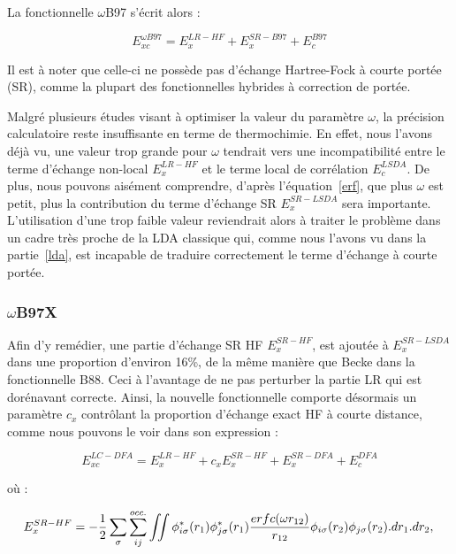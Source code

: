 	La fonctionnelle $\omega$B97\cite{chai2008long} s'écrit alors :
	
	\begin{equation}
	E_{xc}^{\omega B97} = E_{x}^{LR-HF} + E_{x}^{SR-B97} + E_{c}^{B97}
	\end{equation}
	
	Il est à noter que celle-ci ne possède pas d'échange Hartree-Fock à courte portée (SR), comme la plupart des fonctionnelles hybrides à correction de portée.
	
	Malgré plusieurs études visant à optimiser la valeur du paramètre $\omega$, la précision calculatoire reste insuffisante en terme de thermochimie. En effet, nous l'avons déjà vu, une valeur trop grande pour $\omega$ tendrait vers une incompatibilité entre le terme d'échange non-local $E_{x}^{LR-HF}$ et le terme local de corrélation $E_{c}^{LSDA}$. De plus, nous pouvons aisément comprendre, d'après l'équation~\ref{erf}, que plus $\omega$ est petit, plus la contribution du terme d'échange SR $E_{x}^{SR-LSDA}$ sera importante. L'utilisation d'une trop faible valeur  reviendrait alors à traiter le problème dans un cadre très proche de la LDA classique qui, comme nous l'avons vu dans la partie~\ref{lda}, est incapable de traduire correctement le terme d'échange à courte portée.
	
	\subsubsection{$\omega$B97X}
	
	Afin d'y remédier, une partie d'échange SR HF $E_{x}^{SR-HF}$, est ajoutée à $E_{x}^{SR-LSDA}$ dans une proportion d'environ 16\%,  de la même manière que Becke dans la fonctionnelle B88. Ceci à l'avantage de ne pas perturber la partie LR qui est dorénavant correcte. Ainsi, la nouvelle fonctionnelle comporte désormais un paramètre $c_{x}$ contrôlant la proportion d'échange exact HF à courte distance, comme nous pouvons le voir dans son expression :
	
	\begin{equation}
	E_{xc}^{LC-DFA} = E_{x}^{LR-HF} + c_{x}E_{x}^{SR-HF} + E_{x}^{SR-DFA} + E_{c}^{DFA}
	\end{equation}
	
	\noindent où :
	
	\begin{equation}
	E_{x}^{SR-HF} = -\frac{1}{2} \sum_{\sigma} \sum_{ij}^{occ.} \iint \phi_{i \sigma}^{*}(r_{1}) \phi_{j \sigma}^{*}(r_{1}) \frac{erfc(\omega r_{12})}{r_{12}} \phi_{i \sigma}(r_{2}) \phi_{j \sigma}(r_{2}).dr_{1}.dr_{2}, \\
	\end{equation}
	
